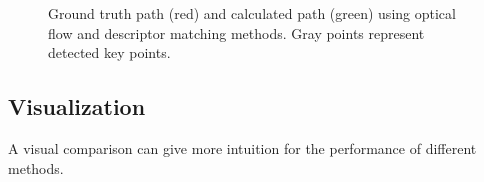 \documentclass[11pt]{easychair}
\begin{document}
\begin{figure}[h!]
\centering
{}
\caption{Ground truth path (red) and calculated path (green) using optical flow and descriptor matching methods. Gray points represent detected key points.}
\end{figure}

\subsection{Visualization}
A visual comparison can give more intuition for the performance of different methods. 
\end{document}
